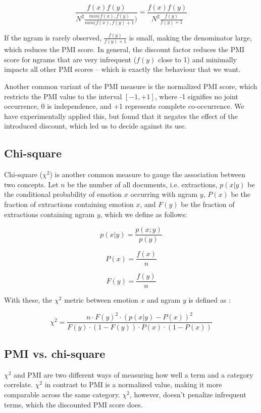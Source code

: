 $$\frac{f(x)f(y)}{N^{2}\frac{min(f(x),f(y)}{min(f(x),f(y) + 1})} = \frac{f(x)f(y)}{N^{2}\frac{f(y)}{f(y) + 1}}$$

If the ngram is rarely observed, $ \frac{f(y)}{f(y) + 1} $ is small, making the denominator large, which reduces the PMI score. In general, the discount factor reduces the PMI score for ngrams that are very infrequent ($f(y)$ close to 1) and minimally impacts all other PMI scores -- which is exactly the behaviour that we want.

Another common variant of the PMI measure is the normalized PMI score, which restricts the PMI value to the interval $[-1,+1]$, where -1 signifies no joint occurrence, 0 is independence, and +1 represents complete co-occurrence. We have experimentally applied this, but found that it negates the effect of the introduced discount, which led us to decide against its use.

\subsection{Chi-square}

Chi-square ($\chi^{2}$) is another common measure to gauge the association between two concepts. Let $n$ be the number of all documents, i.e. extractions, $p(x|y)$ be the conditional probability of emotion $x$ occurring with ngram $y$, $P(x)$ be the fraction of extractions containing emotion $x$, and $F(y)$ be the fraction of extractions containing ngram $y$, which we define as follows:

$$p(x|y) = \frac{p(x;y)}{p(y)}$$

$$P(x) = \frac{f(x)}{n}$$

$$F(y) = \frac{f(y)}{n}$$

With these, the $\chi^{2}$ metric between emotion $x$ and ngram $y$ is defined as \cite{chi-square}: 

$$\chi^{2} = \frac{n \cdot F(y)^{2} \cdot (p(x|y) - P(x))^{2}}{F(y) \cdot (1 - F(y)) \cdot P(x) \cdot (1 - P(x))}$$

\subsection{PMI vs. chi-square}

$\chi^{2}$ and PMI are two different ways of measuring how well a term and a category correlate. $\chi^{2}$ in contrast to PMI is a normalized value, making it more comparable across the same category. $\chi^{2}$, however, doesn't penalize infrequent terms, which the discounted PMI score does.

